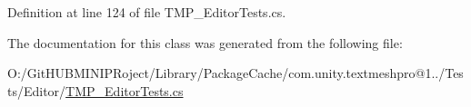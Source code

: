 Definition at line 124 of file T\+M\+P\+\_\+\+Editor\+Tests.\+cs.



The documentation for this class was generated from the following file\+:\begin{DoxyCompactItemize}
\item 
O\+:/\+Git\+H\+U\+B\+M\+I\+N\+I\+P\+Roject/\+Library/\+Package\+Cache/com.\+unity.\+textmeshpro@1../\+Tests/\+Editor/\mbox{\hyperlink{_t_m_p___editor_tests_8cs}{T\+M\+P\+\_\+\+Editor\+Tests.\+cs}}\end{DoxyCompactItemize}
